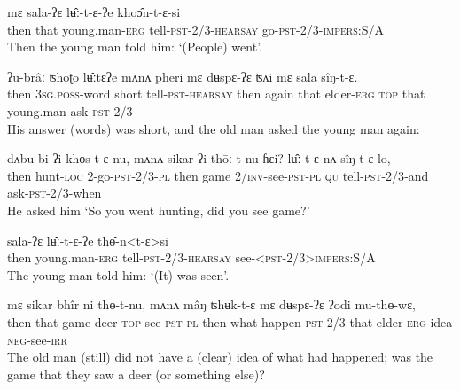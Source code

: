 \documentclass[twoside,a4paper,11pt]{article}
\newcommand{\ipa}[1]{{\phon#1}}
\begin{document}
 \begin{exe}
\ex 
\gll  \ipa{mʌnʌ}  	\ipa{mɛ}  	\ipa{sala-ʔɛ}  	\ipa{lʉ̂ː-t-ɛ-ʔe}  	\ipa{khoɔ̂n-t-ɛ-si}  \\
then that young.man-\textsc{erg} tell-\textsc{pst-2/3-hearsay} go-\textsc{pst-2/3-impers:S/A} \\
\glt Then the young man told him: `(People) went'.
\end{exe} 

 \begin{exe}
\ex 
\gll \ipa{mʌnʌ}  	\ipa{ʔu-brâː}  	\ipa{ʦhoʈo}  	\ipa{lʉ̂ːtɛʔe}  	\ipa{mʌnʌ}  	\ipa{pheri}  	\ipa{mɛ}  	\ipa{dʉspɛ-ʔɛ}  	\ipa{ʦʌ̄i}  	\ipa{mɛ}  	\ipa{sala}  	\ipa{sîŋ-t-ɛ.}   \\
then \textsc{3sg.poss}-word short  tell-\textsc{pst-hearsay} then again that elder-\textsc{erg} \textsc{top} that young.man ask-\textsc{pst}-2/3\\
\glt His answer (words) was short, and the old man asked the young man again:
\end{exe} 



 \begin{exe}
\ex 
\gll \ipa{mʌnʌ}  	\ipa{dʌbu-bi}  	\ipa{ʔi-khɵs-t-ɛ-nu,}  	\ipa{mʌnʌ}  	\ipa{sikar}  	\ipa{ʔi-thōː-t-nu}  	\ipa{ɦɛi?}  \ipa{lʉ̂ː-t-ɛ-nʌ}  	\ipa{sîŋ-t-ɛ-lo,}    \\
then hunt-\textsc{loc} 2-go-\textsc{pst-2/3-pl} then game \textsc{2/inv}-see-\textsc{pst-pl} 
\textsc{qu} tell-\textsc{pst-2/3}-and ask-\textsc{pst-2/3}-when \\
\glt He asked him `So you went hunting, did you see game?'
\end{exe} 

 \begin{exe}
\ex 
\gll \ipa{mʌnʌ}  	\ipa{sala-ʔɛ}  	\ipa{lʉ̂ː-t-ɛ-ʔe}  	\ipa{thɵ̂-n<t-ɛ>si}    \\
then young.man-\textsc{erg} tell-\textsc{pst-2/3-hearsay} see-\textsc{<pst-2/3>impers:S/A} \\
\glt The young man told him: `(It) was seen'.
\end{exe} 


 \begin{exe}
\ex 
\gll \ipa{mʌnʌ}  	\ipa{mɛ}  	\ipa{sikar}  	\ipa{bhîr}  	\ipa{ni}  	\ipa{thɵ-t-nu,} \ipa{mʌnʌ}  	\ipa{mâŋ}  	\ipa{ʦhʉk-t-ɛ}  	\ipa{mɛ}  	\ipa{dʉspɛ-ʔɛ}  	\ipa{ʔodi}  	\ipa{mu-thɵ-wɛ,}   \\
then that game deer \textsc{top} see-\textsc{pst-pl} then what happen-\textsc{pst}-2/3 that elder-\textsc{erg} idea \textsc{neg}-see-\textsc{irr}  \\
\glt The old man (still) did not have a (clear) idea of what had happened; was the game that they saw a deer (or something else)?
\end{exe} 
\end{document}
